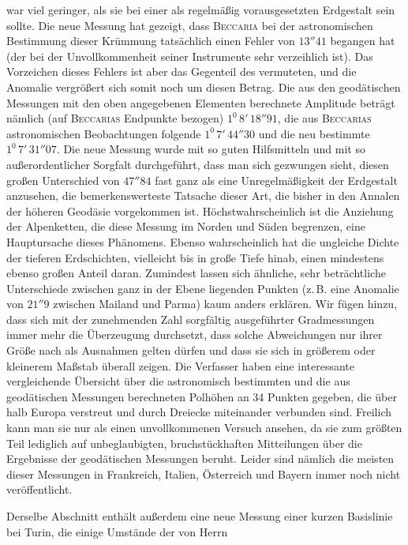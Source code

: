 %
war viel geringer, als sie bei einer als regelmäßig vorausgesetzten Erdgestalt sein sollte. Die neue Messung hat gezeigt, dass \textsc{Beccaria} bei der astronomischen Bestimmung dieser Krümmung tatsächlich einen Fehler von \(13''41\) begangen hat (der bei der Unvollkommenheit seiner Instrumente sehr verzeihlich ist). Das Vorzeichen dieses Fehlers ist aber das Gegenteil des vermuteten, und die Anomalie vergrößert sich somit noch um diesen Betrag. Die aus den geodätischen Messungen mit den oben angegebenen Elementen berechnete Amplitude beträgt nämlich (auf \textsc{Beccarias} Endpunkte bezogen) \(1^0\,8'\,18''91\), die aus \textsc{Beccarias} astronomischen Beobachtungen folgende \(1^0\,7'\,44''30\) und die neu bestimmte \(1^0\,7'\,31''07\). Die neue Messung wurde mit so guten Hilfsmitteln und mit so außerordentlicher Sorgfalt durchgeführt, dass man sich gezwungen sieht, diesen großen Unterschied von \(47''84\) fast ganz als eine Unregelmäßigkeit der Erdgestalt anzusehen, die bemerkenswerteste Tatsache dieser Art, die bisher in den Annalen der höheren Geodäsie vorgekommen ist. Höchstwahrscheinlich ist die Anziehung der Alpenketten, die diese Messung im Norden und Süden begrenzen, eine Hauptursache dieses Phänomens. Ebenso wahrscheinlich hat die ungleiche Dichte der tieferen Erdschichten, vielleicht bis in große Tiefe hinab, einen mindestens ebenso großen Anteil daran. Zumindest lassen sich ähnliche, sehr beträchtliche Unterschiede zwischen ganz in der Ebene liegenden Punkten (z.\,B. eine Anomalie von \(21''9\) zwischen Mailand und Parma) kaum anders erklären. Wir fügen hinzu, dass sich mit der zunehmenden Zahl sorgfältig ausgeführter Gradmessungen immer mehr die Überzeugung durchsetzt, dass solche Abweichungen nur ihrer Größe nach als Ausnahmen gelten dürfen und dass sie sich in größerem oder kleinerem Maßstab überall zeigen. Die Verfasser haben eine interessante vergleichende Übersicht über die astronomisch bestimmten und die aus geodätischen Messungen berechneten Polhöhen an 34 Punkten gegeben, die über halb Europa verstreut und durch Dreiecke miteinander verbunden sind. Freilich kann man sie nur als einen unvollkommenen Versuch ansehen, da sie zum größten Teil lediglich auf unbeglaubigten, bruchstückhaften Mitteilungen über die Ergebnisse der geodätischen Messungen beruht. Leider sind nämlich die meisten dieser Messungen in Frankreich, Italien, Österreich und Bayern immer noch nicht veröffentlicht.

Derselbe Abschnitt enthält außerdem eine neue Messung einer kurzen Basislinie bei Turin, die einige Umstände der von Herrn~%
